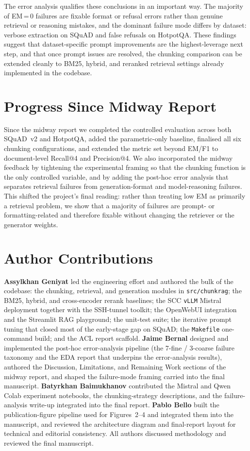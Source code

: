 \documentclass[11pt]{article}
\begin{document}
The error analysis qualifies these conclusions in an important way. The majority of
EM\,=\,0 failures are fixable format or refusal errors rather than genuine retrieval or
reasoning mistakes, and the dominant failure mode differs by dataset: verbose extraction
on SQuAD and false refusals on HotpotQA. These findings suggest that dataset-specific
prompt improvements are the highest-leverage next step, and that once prompt issues are
resolved, the chunking comparison can be extended cleanly to BM25, hybrid, and reranked
retrieval settings already implemented in the codebase.

\section*{Progress Since Midway Report}

Since the midway report we completed the controlled evaluation across both SQuAD~v2
and HotpotQA, added the parametric-only baseline, finalised all six chunking
configurations, and extended the metric set beyond EM/F1 to document-level Recall@4
and Precision@4. We also incorporated the midway feedback by tightening the
experimental framing so that the chunking function is the only controlled variable,
and by adding the post-hoc error analysis that separates retrieval failures from
generation-format and model-reasoning failures. This shifted the project's final
reading: rather than treating low EM as primarily a retrieval problem, we show that a
majority of failures are prompt- or formatting-related and therefore fixable without
changing the retriever or the generator weights.

\section*{Author Contributions}

\textbf{Assylkhan Geniyat} led the engineering effort and authored the bulk of the
codebase: the chunking, retrieval, and generation modules in \texttt{src/chunkrag};
the BM25, hybrid, and cross-encoder rerank baselines; the SCC \texttt{vLLM} Mistral
deployment together with the SSH-tunnel toolkit; the OpenWebUI integration and the
Streamlit RAG playground; the unit-test suite; the iterative prompt tuning that closed
most of the early-stage gap on SQuAD; the \texttt{Makefile} one-command build; and the
ACL report scaffold.
\textbf{Jaime Bernal} designed and implemented the post-hoc error-analysis pipeline
(the 7-fine / 3-coarse failure taxonomy and the EDA report that underpins the
error-analysis results), authored the Discussion, Limitations, and Remaining Work
sections of the midway report, and shaped the failure-mode framing carried into the
final manuscript.
\textbf{Batyrkhan Baimukhanov} contributed the Mistral and Qwen Colab experiment
notebooks, the chunking-strategy descriptions, and the failure-analysis write-up
integrated into the final report.
\textbf{Pablo Bello} built the publication-figure pipeline used for Figures~2--4 and
integrated them into the manuscript, and reviewed the architecture diagram and
final-report layout for technical and editorial consistency.
All authors discussed methodology and reviewed the final manuscript.
\end{document}
